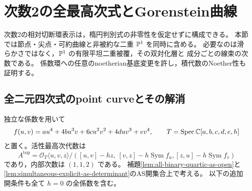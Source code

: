 \section{次数2の全最高次式とGorenstein曲線}
\label{sec:degree-two-gorenstein-curve}

次数2の相対切断環表示は，楕円判別式の非零性を仮定せずに構成できる。
本節では節点・尖点・可約曲線と非被約な二重 $\mathbb P^1$ を同時に含める。
必要なのは滑らかさではなく，$\mathbb P^1$ の有限平坦二重被覆，その双対化層と
成分ごとの線束の次数である。
係数環への任意のnoetherian基底変更を許し，積代数のNoether性も証明する。

\subsection{全二元四次式のpoint curveとその解消}

独立な係数を用いて
\[
 f(u,v)=a u^4+4b u^3v+6c u^2v^2+4d uv^3+e v^4,
 \qquad T=\operatorname{Spec}\mathbb C[a,b,c,d,e,h]
\]
と置く。活性最高次代数は
\[
 A^{\mathrm{top}}=
 \mathcal O_T\langle u,v,z\rangle/
 ([u,v]-hz,\ [v,z]-h\operatorname{Sym}f_u,
                 [z,u]-h\operatorname{Sym}f_v)
\]
であり，内部次数は $(1,1,2)$ である。
補題\ref{lem:all-binary-quartic-as-open}と
\ref{lem:simultaneous-explicit-as-determinant}のAS開集合上で考える。
以下の追加開条件も全て $h=0$ の全係数を含む。


